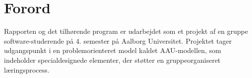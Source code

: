 \section*{Forord}
\label{sec:forord}
Rapporten og det tilhørende program er udarbejdet som et projekt af en gruppe software-studerende på 4. semester på Aalborg Universitet. Projektet tager udgangspunkt i en problemorienteret model kaldet AAU-modellen, som indeholder specialdesignede elementer, der støtter en gruppeorganiseret læringsprocess.